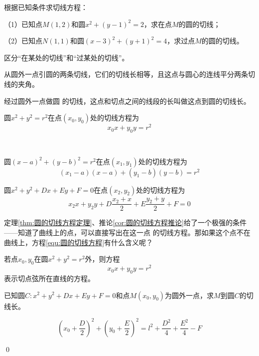 \begin{example}根据已知条件求切线方程：

    （1）已知点\(M(1,2)\)和圆\(x^2+(y-1)^2=2\)，求在点\(M\)的圆的切线；

    （2）已知点\(N(1,1)\)和圆\((x-3)^2+(y+1)^2=4\)，求过点\(M\)的圆的切线。
\end{example}
区分“在某处的切线”和“过某处的切线”。
\begin{theorem}[切线长定理]
    从圆外一点引圆的两条切线，它们的切线长相等，且这点与圆心的连线平分两条切线的夹角。
    \begin{definition}[切线长]
        经过圆外一点做圆
        的切线，这点和切点之间的线段的长叫做这点到圆的切线长。
    \end{definition}
\end{theorem}
\begin{theorem}\label{thm:圆的切线方程定理}
    圆\(x^2+y^2=r^2\)在点\((x_0,y_0)\)处的切线方程为
    \begin{equation}\label{equ:圆的切线方程}
        x_0x+y_0y=r^2
    \end{equation}
\end{theorem}
\begin{corollary}\label{cor:圆的切线方程推论}
    \ 

    圆\((x-a)^2+(y-b)^2=r^2\)在点\((x_1,y_1)\)处的切线方程为
    \begin{equation}
        (x_1-a)(x-a)+(y_1-b)(y-b)=r^2
    \end{equation}

    圆\(x^2+y^2+Dx+Ey+F=0\)在点\((x_2,y_2)\)处的切线方程为
    \begin{equation}
        x_2x+y_2y+D\frac{x_2+x}{2}+E\frac{y_2+y}{2}+F=0
    \end{equation}
\end{corollary}
定理\ref{thm:圆的切线方程定理}、推论\ref{cor:圆的切线方程推论}给了一个极强的条件——知道了曲线上的点，可以直接写出在这一点
的切线方程。那如果这个点不在曲线上，方程\ref{equ:圆的切线方程}有什么含义呢？

\begin{theorem}
    若点\(x_0,y_0\)在圆\(x^2+y^2=r^2\)外，则方程\[x_0x+y_0y=r^2\]表示切点弦所在直线的方程。
\end{theorem}









\begin{example}
    已知圆\(C:x^2+y^2+Dx+Ey+F=0\)和点\(M(x_0,y_0)\)为圆外一点，求\(M\)到圆\(C\)的切线长。
\end{example}
\begin{jie}
    \[(x_0+\frac{D}{2})^2+(y_0+\frac{E}{2})^2=l^2+\frac{D^2}{4}+\frac{E^2}{4}-F\]

\qed
\end{jie}

